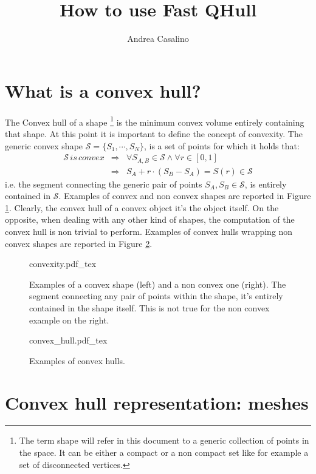 \documentclass{article}
\author{Andrea Casalino}
\title{How to use Fast QHull}
\begin{document}
\maketitle

\newpage
\section{What is a convex hull?}

The Convex hull of a shape \footnote{The term shape will refer in this document to a generic collection of points in the space. It can be either a compact or a non compact set like for example a set of disconnected vertices.} is the minimum convex volume entirely containing that shape. At this point it is important to define the concept of convexity.
The generic convex shape  $\mathcal{S} =  \lbrace S_1, \cdots, S_N  \rbrace$, is a set of points for which it holds that:
\begin{eqnarray}
\mathcal{S} \mathit{\,is\,convex} & \Rightarrow & \forall S_{A,B} \in \mathcal{S} \wedge \forall r\in[0,1] 
\\
& \Rightarrow & S_A + r \cdot (S_B - S_A) = S(r) \in \mathcal{S}
\end{eqnarray}
i.e. the segment connecting the generic pair of points $S_A, S_B \in \mathcal{S}$, is entirely contained in $\mathcal{S}$. Examples of convex and non convex shapes are reported in Figure \ref{fig:convexity}.
Clearly, the convex hull of a convex object it's the object itself. On the opposite, when dealing with any other kind of shapes, the computation of the convex hull is non trivial to perform. Examples of convex hulls wrapping non convex shapes are reported in Figure 
\ref{fig:convex_hull}.

\begin{figure}
	\centering
\def\svgwidth{0.95 \columnwidth}
{convexity.pdf_tex} 
	\caption{Examples of a convex shape (left) and a non convex one (right). The segment connecting any pair of points within the shape, it's entirely contained in the shape itself. This is not true for the non convex example on the right.}
	\label{fig:convexity}
\end{figure} 

\begin{figure}
	\centering
\def\svgwidth{0.95 \columnwidth}
{convex_hull.pdf_tex} 
	\caption{Examples of convex hulls.}
	\label{fig:convex_hull}
\end{figure} 

\section{Convex hull representation: meshes}
\end{document}
